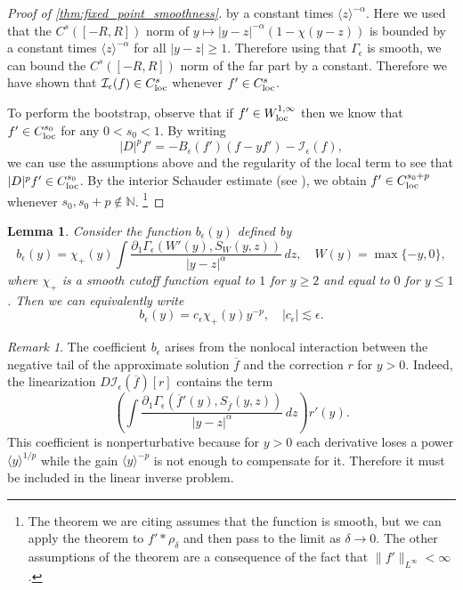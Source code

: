 \documentclass[11pt]{amsart}
\newtheorem{lemma}[theorem]{Lemma}
\theoremstyle{definition}
\theoremstyle{remark}
\newtheorem{remark}[theorem]{Remark}
\numberwithin{equation}{section}
\newcommand{\N}{\mathbb{N}}
\newcommand{\mc}[1]{\mathcal{#1}}
\newcommand{\ov}[1]{\overline{#1}}
\newcommand{\ang}[1]{\langle #1 \rangle}
\begin{document}
\begin{proof}[Proof of \cref{thm:fixed_point_smoothness}]
    by a constant times $\ang{z}^{-\alpha}$. Here we used that the $C^s([-R,R])$ norm of $y \mapsto |y - z|^{-\alpha}(1 - \chi(y - z))$ is bounded by a constant times $\ang{z}^{-\alpha}$ for all $|y - z| \geq 1$. Therefore using that $\Gamma_\epsilon$ is smooth, we can bound the $C^s([-R,R])$ norm of the far part by a constant. Therefore we have shown that $\mc{I}_\epsilon(f) \in C^s_{\textup{loc}}$ whenever $f' \in C^s_{\textup{loc}}$. \par
    To perform the bootstrap, observe that if $f' \in W_{\textup{loc}}^{1,\infty}$ then we know that $f' \in C_{\textup{loc}}^{s_0}$ for any $0<s_0<1$. By writing 
    \[|D|^pf' = -B_\epsilon(f')(f - yf') - \mc{I}_\epsilon(f),\]
    we can use the assumptions above and the regularity of the local term to see that $|D|^pf'\in C_{\textup{loc}}^{s_0}$.
    By the interior Schauder estimate (see \cite[Corollary~2.4]{RosOton-Serra:dirichlet-fractional-laplacian}), we obtain $f'\in C_{\textup{loc}}^{s_0+p}$ whenever $s_0,s_0+p\notin\N$. \footnote{The theorem we are citing assumes that the function is smooth, but we can apply the theorem to $f'*\rho_\delta$ and then pass to the limit as $\delta\to0$. The other assumptions of the theorem are a consequence of the fact that $\|f'\|_{L^\infty} < \infty$.}
\end{proof}

\begin{lemma}\label{lem:analysis_coefficient}
    Consider the function $b_\epsilon(y)$ defined by 
    \[b_\epsilon(y) = \chi_+(y)\int \frac{\partial_1\Gamma_\epsilon(W'(y), S_W(y,z))}{|y-z|^{\alpha}}\,dz, \quad W(y) = \max\{-y,0\},\]
    where $\chi_+$ is a smooth cutoff function equal to $1$ for $y \geq 2$ and equal to $0$ for $y \leq 1$. Then we can equivalently write 
    \[b_\epsilon(y) = c_\epsilon\chi_+(y)y^{-p}, \quad |c_\epsilon| \lesssim \epsilon.\]
\end{lemma}

\begin{remark}\label{rmk:analysis_coefficient}
    The coefficient $b_\epsilon$ arises from the nonlocal interaction between the negative tail of the approximate solution $\ov{f}$ and the correction $r$ for $y > 0$. Indeed, the linearization $D\mc{I}_\epsilon(\ov{f})[r]$ contains the term
    \[\left(\int \frac{\partial_1\Gamma_\epsilon(\ov{f}'(y), S_{\ov{f}}(y,z))}{|y-z|^\alpha}\,dz\right)r'(y).\]
    This coefficient is nonperturbative because for $y > 0$ each derivative loses a power $\ang{y}^{1/p}$ while the gain $\ang{y}^{-p}$ is not enough to compensate for it. Therefore it must be included in the linear inverse problem.
\end{remark}
\end{document}
